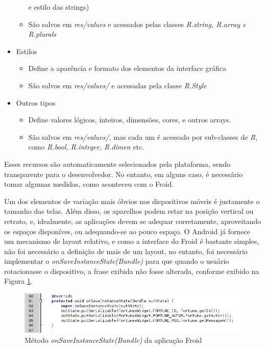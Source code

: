 \begin{itemize}
\begin{itemize}
            e estilo das strings)
            \item São salvos em {\it res/values} e acessados pelas classes 
            {\it R.string, R.array e R.plurals}
        \end{itemize}
    \item Estilos
        \begin{itemize}
            \item Define a aparência e formato dos elementos da interface gráfica
            \item São salvos em {\it res/values/} e acessadas pela classe {\it R.Style}
        \end{itemize}
    \item Outros tipos
        \begin{itemize}
            \item Define valores lógicos, inteiros, dimensões, cores, e outros arrays.
            \item São salvos em {\it res/values/}, mas cada um é acessado por sub-classes
            de {\it R}, como {\it R.bool, R.integer, R.dimen} etc.
        \end{itemize}
\end{itemize}

Esses recursos são automaticamente
selecionados pela plataforma, sendo transparente para o desenvolvedor. No entanto,
em alguns caso, é necessário tomar algumas medidas, como aconteceu com o Froid.

Um dos elementos de variação mais óbvios nos dispositivos móveis é justamente o tamanho das telas. Além disso, os aparelhos podem estar na posição vertical ou retrato, e, idealmente, 
as aplicações devem se adequar corretamente, aproveitando os espaços disponíves, ou 
adequando-se ao pouco espaço. O Android já fornece um mecanismo de layout relativo,
e como a interface do Froid é bastante simples, não foi necessário a definição de 
mais de um layout, no entanto, foi necessário implementar o {\it onSaveInstanceState(Bundle)}
para que quando o usuário rotacionasse o dispositivo, a frase exibida não fosse alterada, 
conforme exibido na Figura \ref{onSaveInstanceState}. 

\begin{figure}[h]
    \centering
    \includegraphics[width=15cm]{img/onSaveInstanceState}
    \caption{Método {\it onSaveInstanceState(Bundle)} da aplicação Froid}
    \label{onSaveInstanceState}
\end{figure}

